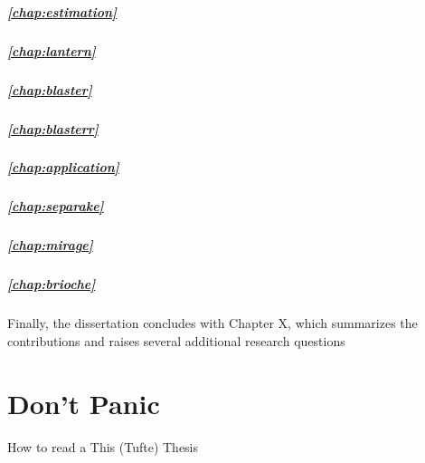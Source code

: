\subparagraph{\cref{chap:estimation}}\blindtext
\subparagraph{\cref{chap:lantern}}\blindtext
\subparagraph{\cref{chap:blaster}}\blindtext
\subparagraph{\cref{chap:blasterr}}\blindtext


\subparagraph{\cref{chap:application}}\blindtext
\subparagraph{\cref{chap:separake}}\blindtext
\subparagraph{\cref{chap:mirage}}\blindtext
\subparagraph{\cref{chap:brioche}}\blindtext


Finally, the dissertation concludes with Chapter X, which summarizes
the contributions and raises several additional research questions


\section{Don't Panic}
How to read a This (Tufte) Thesis